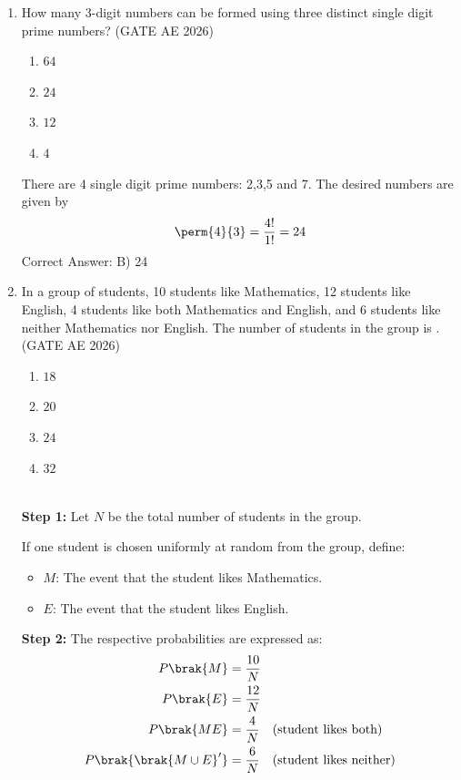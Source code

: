 \begin{enumerate}
	\item 
How many 3-digit numbers can be formed using three distinct single digit prime numbers?
\hfill (GATE AE 2026)
\begin{enumerate}
    \item $64$
    \item $24$
    \item $12$
    \item $4$
\end{enumerate} 
\solution
 There are 4 single digit prime numbers: 2,3,5 and 7. The desired numbers are given by
 \begin{align}
	 \perm{4}{3} = \frac{4!}{1!} = 24
 \end{align}
\noindent Correct Answer: B) 24
\newpage

		\item
In a group of students, 10 students like Mathematics, 12 students like English, 4 students like both Mathematics and English, and 6 students like neither Mathematics nor English. The number of students in the group is \underline{\hspace{1cm}}.
\hfill (GATE AE 2026)
\begin{enumerate}
    \item $18$
    \item $20$
    \item $24$
    \item $32$
\end{enumerate} 

\solution \\ 
\noindent\textbf{Step 1:} Let $N$ be the total number of students in the group. 

\noindent If one student is chosen uniformly at random from the group, define:
\begin{itemize}
    \item $M$: The event that the student likes Mathematics.
    \item $E$: The event that the student likes English.
\end{itemize}

 \noindent\textbf{Step 2:} The respective probabilities are expressed as:
\begin{align}
P\brak{M} &= \frac{10}{N} \\
P\brak{E} &= \frac{12}{N} \\
P\brak{ME} &= \frac{4}{N} \quad \text{(student likes both)} \\
P\brak{\brak{M \cup E}'} &= \frac{6}{N} \quad \text{(student likes neither)}
\end{align}


\end{enumerate}
